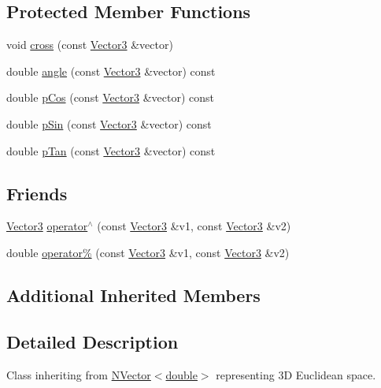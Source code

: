 \subsection*{Protected Member Functions}
\begin{DoxyCompactItemize}
\item 
void \mbox{\hyperlink{class_vector3_a2197fa650334cfd893c96e0e709de1ef}{cross}} (const \mbox{\hyperlink{class_vector3}{Vector3}} \&vector)
\item 
double \mbox{\hyperlink{class_vector3_a4ec864436ebac499950f4c06091688db}{angle}} (const \mbox{\hyperlink{class_vector3}{Vector3}} \&vector) const
\item 
double \mbox{\hyperlink{class_vector3_a98422ceb8200829cea11bdeb6417daba}{p\+Cos}} (const \mbox{\hyperlink{class_vector3}{Vector3}} \&vector) const
\item 
double \mbox{\hyperlink{class_vector3_a38053a75ccb2f7415fff046609c52e31}{p\+Sin}} (const \mbox{\hyperlink{class_vector3}{Vector3}} \&vector) const
\item 
double \mbox{\hyperlink{class_vector3_aef71e3e404dd8183e3bd5ed901e91444}{p\+Tan}} (const \mbox{\hyperlink{class_vector3}{Vector3}} \&vector) const
\end{DoxyCompactItemize}
\subsection*{Friends}
\begin{DoxyCompactItemize}
\item 
\mbox{\hyperlink{class_vector3}{Vector3}} \mbox{\hyperlink{class_vector3_a5500ab32f732fd9b9ed9a530b1a2ff06}{operator$^\wedge$}} (const \mbox{\hyperlink{class_vector3}{Vector3}} \&v1, const \mbox{\hyperlink{class_vector3}{Vector3}} \&v2)
\item 
double \mbox{\hyperlink{class_vector3_a3ec8a9ae24e8b79b7d6c360af8d9ad38}{operator\%}} (const \mbox{\hyperlink{class_vector3}{Vector3}} \&v1, const \mbox{\hyperlink{class_vector3}{Vector3}} \&v2)
\end{DoxyCompactItemize}
\subsection*{Additional Inherited Members}


\subsection{Detailed Description}
Class inheriting from \mbox{\hyperlink{class_n_vector}{N\+Vector$<$double$>$}} representing 3D Euclidean space. 

